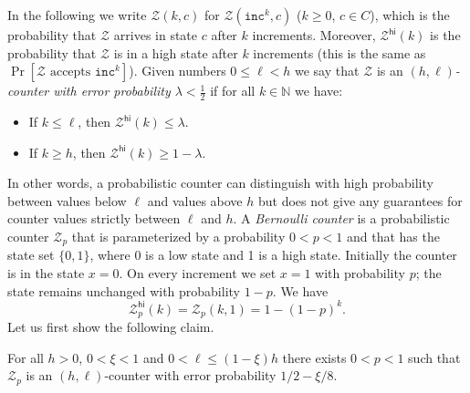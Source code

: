 \documentclass{theoretics}
\newcommand{\N}{\mathbb{N}}
\newcommand{\BZ}{\mathcal{Z}}
\renewcommand{\geq}{\geqslant}
\renewcommand{\leq}{\leqslant}
\renewcommand{\ge}{\geq}
\renewcommand{\le}{\leq}
\begin{document}
In the following we write $\BZ(k,c)$ for $\BZ(\mathtt{inc}^k, c)$ ($k \geq 0$, $c \in C$), which is the probability
that $\BZ$ arrives in state $c$ after $k$ increments. Moreover, $\BZ^{\mathsf{hi}}(k)$ is the probability
that $\BZ$ is in a high state after $k$ increments (this is the same as $\Pr[\BZ \text{ accepts } \mathtt{inc}^k]$).  
Given numbers $0 \le \ell < h$ we say that $\BZ$ is an
{\em $(h,\ell)$-counter with error probability $\lambda < \frac{1}{2}$}
if for all $k \in \N$ we have:
\begin{itemize}
	\item If $k \le \ell$, then $\BZ^{\mathsf{hi}}(k) \le \lambda$.
	\item If $k \ge h$, then $\BZ^{\mathsf{hi}}(k)  \ge 1-\lambda$.
\end{itemize}
In other words, a probabilistic counter can distinguish with high probability 
between values below $\ell$ and values above $h$
but does not give any guarantees for counter values strictly between $\ell$ and $h$.
A {\em Bernoulli counter} is a probabilistic counter 
$\BZ_p$ that is parameterized by a probability $0 < p < 1$ and that
has the state set $\{0,1\}$, where 0 is a low state and 1 is a high state.
Initially the counter is in the state $x = 0$.
On every increment we set $x = 1$ with probability $p$;
the state remains unchanged with probability $1-p$.
We have
\[
 \BZ_p^{\mathsf{hi}}(k) = \BZ_p(k,1) = 1-(1-p)^k.
\]
Let us first show the following claim.

\begin{lemma} \label{claim-bernoulli}
	For all $h>0$, $0 < \xi < 1$ and $0 <\ell \le (1-\xi) h$
	there exists $0 < p < 1$ such that $\BZ_p$ is an $(h,\ell)$-counter
	with error probability $1/2 - \xi/8$. 
\end{lemma}
\end{document}
